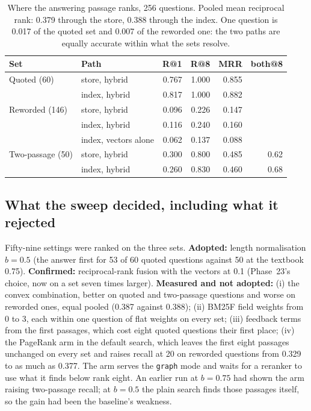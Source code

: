 \begin{table}[h]
\centering\small
\begin{tabular}{llrrrr}
\toprule
Set & Path & R@1 & R@8 & MRR & both@8 \\
\midrule
Quoted (60) & store, hybrid & 0.767 & 1.000 & 0.855 & \\
 & index, hybrid & 0.817 & 1.000 & 0.882 & \\
Reworded (146) & store, hybrid & 0.096 & 0.226 & 0.147 & \\
 & index, hybrid & 0.116 & 0.240 & 0.160 & \\
 & index, vectors alone & 0.062 & 0.137 & 0.088 & \\
Two-passage (50) & store, hybrid & 0.300 & 0.800 & 0.485 & 0.62 \\
 & index, hybrid & 0.260 & 0.830 & 0.460 & 0.68 \\
\bottomrule
\end{tabular}
\caption{Where the answering passage ranks, 256 questions. Pooled mean reciprocal rank: 0.379 through the store, 0.388 through the index. One question is 0.017
of the quoted set and 0.007 of the reworded one: the two paths are equally accurate within what the sets resolve.}
\label{tab:p25acc}
\end{table}

\subsection{What the sweep decided, including what it rejected}

Fifty-nine settings were ranked on the three sets. \textbf{Adopted:} length normalisation $b=0.5$ (the answer first for 53 of 60 quoted questions against 50 at
the textbook 0.75). \textbf{Confirmed:} reciprocal-rank fusion with the vectors at 0.1 (Phase~23's choice, now on a set seven times larger). \textbf{Measured and
not adopted:} (i) the convex combination, better on quoted and two-passage questions and worse on reworded ones, equal pooled (0.387 against 0.388); (ii) BM25F
field weights from 0 to 3, each within one question of flat weights on every set; (iii) feedback terms from the first passages, which cost eight quoted questions
their first place; (iv) the PageRank arm in the default search, which leaves the first eight passages unchanged on every set and raises recall at 20 on reworded
questions from 0.329 to as much as 0.377. The arm serves the \texttt{graph} mode and waits for a reranker to use what it finds below rank eight. An earlier run at
$b=0.75$ had shown the arm raising two-passage recall; at $b=0.5$ the plain search finds those passages itself, so the gain had been the baseline's weakness.

